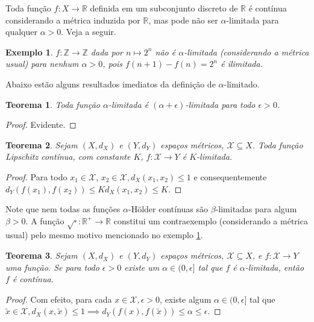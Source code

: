 \documentclass[a4paper,12pt]{article}
\newtheorem{theorem}{Teorema}
\newtheorem{example}{Exemplo}
\theoremstyle{definition}
\begin{document}
Toda função $f : X \to \mathbb{R}$ definida em um subconjunto discreto de $\mathbb{R}$ é contínua considerando a métrica induzida por $\mathbb{R}$, mas pode não ser $\alpha$-limitada para qualquer $\alpha > 0$. Veja a seguir.

\begin{example} \label{two_to_n} $f : \mathbb{Z} \to \mathbb{Z}$ dada por $n \mapsto 2^n$ não é $\alpha$-limitada (considerando a métrica usual) para nenhum $\alpha > 0$, pois $f(n + 1) - f(n) = 2^{n}$ é ilimitada. \end{example}

Abaixo estão alguns resultados imediatos da definição de $\alpha$-limitado.

\begin{theorem} Toda função $\alpha$-limitada é $(\alpha+\epsilon)$-limitada para todo $\epsilon > 0$. \end{theorem} \begin{proof} Evidente. \end{proof}

\begin{theorem} Sejam $(X, d_X)$ e $(Y, d_Y)$ espaços métricos, $\mathcal{X} \subseteq X$. Toda função Lipschitz contínua, com constante $K$, $f : \mathcal{X} \to Y$ é $K$-limitada. \end{theorem} \begin{proof} Para todo $x_1 \in \mathcal{X}$, $x_2 \in \mathcal{X}, d_X(x_1, x_2) \le 1$ e consequentemente $d_Y(f(x_1), f(x_2)) \le K d_X(x_1, x_2) \le K$. \end{proof}
Note que nem todas as funções $\alpha$-Hölder contínuas são $\beta$-limitadas para algum $\beta > 0$. A função $\sqrt{\cdot} : \mathbb{R}^+ \to \mathbb{R}$ constitui um contraexemplo (considerando a métrica usual) pelo mesmo motivo mencionado no exemplo \ref{two_to_n}.

\begin{theorem} Sejam $(X, d_X)$ e $(Y, d_Y)$ espaços métricos, $\mathcal{X} \subseteq X$, e $f : \mathcal{X} \to Y$ uma função. Se para todo $\epsilon > 0$ existe um $\alpha \in (0, \epsilon]$ tal que $f$ é $\alpha$-limitada, então $f$ é contínua. \end{theorem} \begin{proof} Com efeito, para cada $x \in \mathcal{X}, \epsilon > 0$, existe algum $\alpha \in (0, \epsilon]$ tal que $\tilde{x} \in \mathcal{X}, d_X(x, \tilde{x}) \le 1 \implies d_Y(f(x), f(\tilde{x})) \le \alpha \le \epsilon$. \end{proof}
\end{document}
